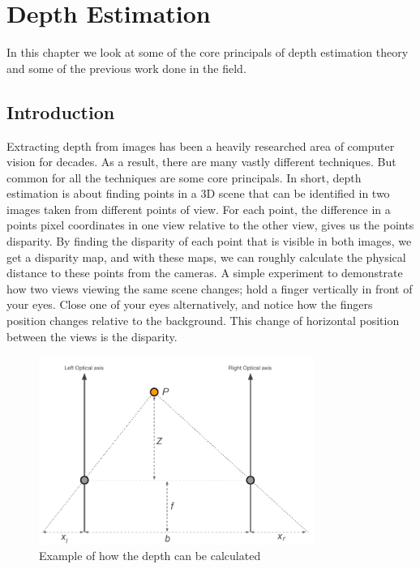 \chapter{Depth Estimation}
\label{chap:depthestimation_theory}


In this chapter we look at some of the core principals of depth
estimation theory and some of the previous work done in the field.

\section{Introduction}

Extracting depth from images has been a heavily researched area of
computer vision for decades. As a result, there are many vastly
different techniques. But common for all the techniques are some core
principals. In short, depth estimation is about finding points in a 3D
scene that can be identified in two images taken from different points
of view. For each point, the difference in a points pixel coordinates
in one view relative to the other view, gives us the points disparity.
By finding the disparity of each point that is visible in both images,
we get a disparity map, and with these maps, we can roughly calculate
the physical distance to these points from the cameras. A simple
experiment to demonstrate how two views viewing the same scene
changes; hold a finger vertically in front of your eyes. Close one of
your eyes alternatively, and notice how the fingers position changes
relative to the background. This change of horizontal position between
the views is the disparity.

\begin{figure}
  \centering
  \label{fig:depth-theory}
  \includegraphics[width=0.8\textwidth]{images/depth-estimation-theory.pdf}
  \caption{Example of how the depth can be calculated}
\end{figure}

